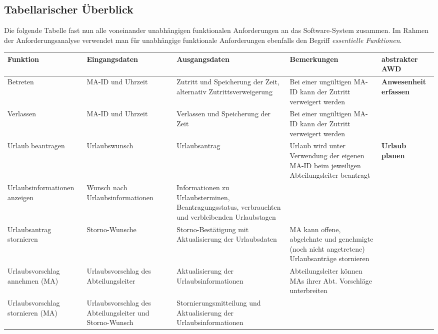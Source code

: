\subsection{Tabellarischer \"Uberblick}
Die folgende Tabelle fast nun alle voneinander unabh\"angigen funktionalen Anforderungen an das Software-System zusammen.  Im Rahmen der Anforderungsanalyse verwendet man f\"ur unabh\"angige funktionale Anforderungen ebenfalls den Begriff  \textit{essentielle Funktionen}.

\vspace{0,5cm}
\hspace{-3,5cm}
{
\footnotesize
\begin{tabular}{|p{3cm}|p{4cm}|p{4cm}|p{4cm}|p{2cm}|}
	\hline
		\textbf{Funktion	} &	
		\textbf{Eingangsdaten} &
		\textbf{Ausgangsdaten}& 
		\textbf{Bemerkungen}	&
		\textbf{abstrakter AWD} \\
	\hline \hline 
		Betreten &
		MA-ID und Uhrzeit &
		Zutritt und Speicherung der Zeit, alternativ Zutrittsverweigerung & 
		Bei einer ung\"ultigen MA-ID kann der Zutritt verweigert werden &  
		\textbf{Anwesenheit erfassen} \\
	\cline{1-4}
		Verlassen & 
		MA-ID und Uhrzeit & 
		Verlassen und Speicherung der Zeit &
		Bei einer ung\"ultigen MA-ID kann der Zutritt verweigert werden & 
		\\
	\hline
		Urlaub beantragen & 
		Urlaubswunsch & 
		Urlaubsantrag & 
		Urlaub wird unter Verwendung der eigenen MA-ID beim jeweiligen Abteilungsleiter beantragt & 
		\textbf{Urlaub  \newline planen} \\
	\cline{1-4}
		Urlaubsinformationen anzeigen & 
		Wunsch nach Urlaubsinformationen & 
		Informationen zu Urlaubsterminen, Beantragungsstatus, verbrauchten und verbleibenden Urlaubstagen &  
		&  
		\\
	\cline{1-4}
		Urlaubsantrag stornieren &
		Storno-Wunsche &
		Storno-Best\"atigung mit Aktualisierung der Urlaubsdaten &
		MA kann offene, abgelehnte und genehmigte (noch nicht angetretene) Urlaubsantr\"age stornieren &
		\\
	\cline{1-4}
		Urlaubsvorschlag annehmen (MA) &
		Urlaubsvorschlag des Abteilungsleiter &
		 Aktualisierung der Urlaubsinformationen &
		Abteilungsleiter k\"onnen MAs ihrer Abt. Vorschl\"age unterbreiten &
		\\
	\cline{1-4}
		Urlaubsvorschlag stornieren (MA) &
		Urlaubsvorschlag des Abteilungsleiter und Storno-Wunsch &
		Stornierungsmitteilung und Aktualisierung der Urlaubsinformationen &

\end{tabular}}
